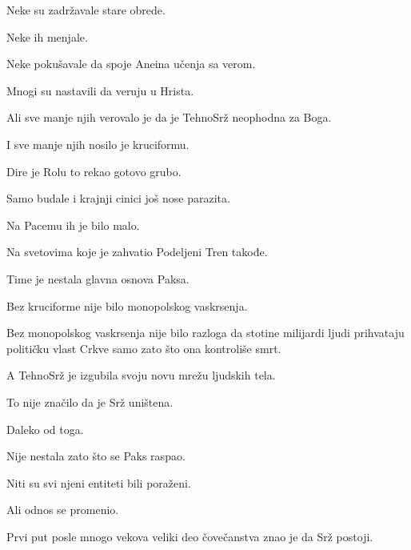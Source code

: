 \bigskip

Neke su zadržavale stare obrede.

Neke ih menjale.

Neke pokušavale da spoje Aneina učenja sa verom.

\bigskip

Mnogi su nastavili da veruju u Hrista.

\bigskip

Ali sve manje njih verovalo je da je TehnoSrž neophodna za Boga.

\bigskip

I sve manje njih nosilo je kruciformu.

\bigskip

Dire je Rolu to rekao gotovo grubo.

\bigskip

Samo budale i krajnji cinici još nose parazita.

\bigskip

Na Pacemu ih je bilo malo.

\bigskip

Na svetovima koje je zahvatio Podeljeni Tren takođe.

\bigskip

Time je nestala glavna osnova Paksa.

\bigskip

Bez kruciforme nije bilo monopolskog vaskrsenja.

\bigskip

Bez monopolskog vaskrsenja nije bilo razloga da stotine milijardi ljudi prihvataju političku vlast Crkve samo zato što ona kontroliše smrt.

\bigskip

A TehnoSrž je izgubila svoju novu mrežu ljudskih tela.

\bigskip

To nije značilo da je Srž uništena.

\bigskip

Daleko od toga.

\bigskip

Nije nestala zato što se Paks raspao.

\bigskip

Niti su svi njeni entiteti bili poraženi.

\bigskip

Ali odnos se promenio.

\bigskip

Prvi put posle mnogo vekova veliki deo čovečanstva znao je da Srž postoji.

